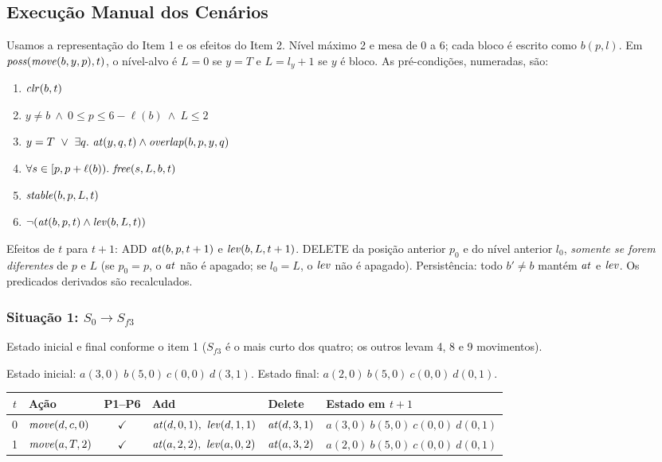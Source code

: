 \subsection{Execução Manual dos Cenários}

Usamos a representação do Item 1 e os efeitos do Item 2. Nível máximo 2 e mesa de 0 a 6; cada bloco é escrito como $b(p,l)$.
Em $\mathit{poss}(\mathit{move}(b,y,p),t)$, o nível-alvo é $L=0$ se $y=T$ e $L=l_y+1$ se $y$ é bloco. As pré-condições, numeradas, são:
\begin{enumerate}
\item[(P1)] $\mathit{clr}(b,t)$
\item[(P2)] $y\neq b\ \land\ 0\le p\le 6-\ell(b)\ \land\ L\le 2$
\item[(P3)] $y=T\ \lor\ \exists q.\ \At(y,q,t)\land\Overlap(b,p,y,q)$
\item[(P4)] $\forall s\in[p,p+\ell(b)).\ \Free(s,L,b,t)$
\item[(P5)] $\mathit{stable}(b,p,L,t)$
\item[(P6)] $\neg(\mathit{at}(b,p,t)\land\mathit{lev}(b,L,t))$
\end{enumerate}
Efeitos de $t$ para $t+1$: ADD $\mathit{at}(b,p,t+1)$ e $\mathit{lev}(b,L,t+1)$. DELETE da posição anterior $p_0$ e do nível anterior $l_0$, \emph{somente se forem diferentes} de $p$ e $L$ (se $p_0=p$, o $\mathit{at}$ não é apagado; se $l_0=L$, o $\mathit{lev}$ não é apagado). Persistência: todo $b'\neq b$ mantém $\mathit{at}$ e $\mathit{lev}$. Os predicados derivados são recalculados.

\subsubsection{Situação 1: $S_0\to S_{f3}$}
Estado inicial e final conforme o item 1 ($S_{f3}$ é o mais curto dos quatro; os outros levam 4, 8 e 9 movimentos).

Estado inicial: $a(3,0)\ b(5,0)\ c(0,0)\ d(3,1)$. Estado final: $a(2,0)\ b(5,0)\ c(0,0)\ d(0,1)$.

\begin{longtable}{c p{2.6cm} c p{3.4cm} p{3.4cm} p{3.6cm}}
\toprule $t$ & Ação & P1--P6 & Add & Delete & Estado em $t+1$ \\ \midrule \endhead
0 & $\mathit{move}(d,c,0)$ & $\checkmark$ & $\At(d,0,1),\ \Lev(d,1,1)$ & $\mathit{at}(d,3,1)$ & $a(3,0)\ b(5,0)\ c(0,0)\ d(0,1)$ \\
1 & $\mathit{move}(a,T,2)$ & $\checkmark$ & $\At(a,2,2),\ \Lev(a,0,2)$ & $\mathit{at}(a,3,2)$ & $a(2,0)\ b(5,0)\ c(0,0)\ d(0,1)$ \\
\bottomrule \end{longtable}

